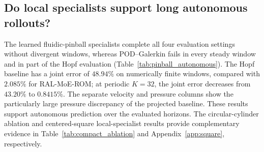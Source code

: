 \subsection{Do local specialists support long autonomous rollouts?}

The learned fluidic-pinball specialists complete all four evaluation settings
without divergent windows, whereas POD--Galerkin fails in every steady window
and in part of the Hopf evaluation (Table~\ref{tab:pinball_autonomous}).
The Hopf baseline has a joint error of $48.94\%$ on numerically finite windows, compared
with $2.085\%$ for RAL-MoE-ROM; at periodic $K=32$, the joint error decreases
from $43.20\%$ to $0.8415\%$. The separate velocity and pressure columns
show the particularly large pressure discrepancy of the projected baseline.
These results support autonomous prediction over the evaluated horizons.
The circular-cylinder ablation and centered-square local-specialist results
provide complementary evidence in Table~\ref{tab:compact_ablation} and
Appendix~\ref{app:square}, respectively.


